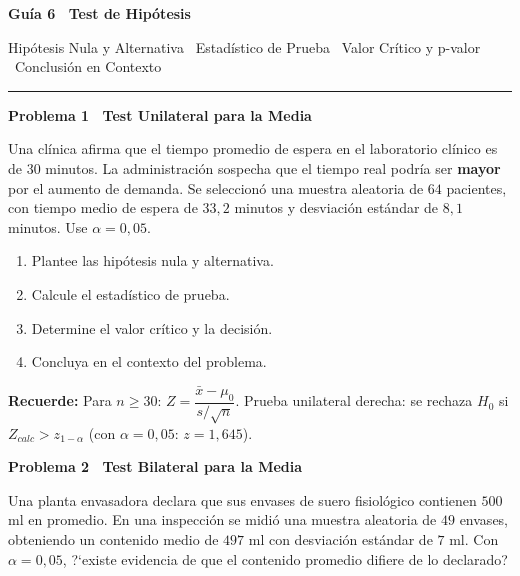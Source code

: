 \documentclass[10pt,letterpaper]{article}
\newcommand{\seccion}[1]{%
  \vspace{2pt}%
  \begin{tcolorbox}[enhanced,colback=white,colframe=black,arc=0pt,boxrule=0pt,
    leftrule=2pt,left=6pt,right=6pt,top=1pt,bottom=1pt]
    {\normalsize\bfseries\sffamily #1}
  \end{tcolorbox}%
  \vspace{1pt}%
}
\newcommand{\reglacaja}[1]{%
  \begin{tcolorbox}[enhanced,colback=white,colframe=black,arc=0pt,boxrule=0.5pt,
    left=6pt,right=6pt,top=2pt,bottom=2pt,breakable]
  \small\sffamily #1
  \end{tcolorbox}%
}
\begin{document}
\thispagestyle{empty}

\begin{center}
  {\fontsize{15}{17}\selectfont\bfseries\sffamily Gu\'ia 6 \textendash\ Test de Hip\'otesis\par}
  \vspace{0.05cm}
  {\small\sffamily Hip\'otesis Nula y Alternativa \textperiodcentered\ Estad\'istico de Prueba \textperiodcentered\ Valor Cr\'itico y p-valor \textperiodcentered\ Conclusi\'on en Contexto\par}
  {\rule{3cm}{0.6pt}}
\end{center}

\vspace{0.15cm}

\seccion{Problema 1 \textendash\ Test Unilateral para la Media}

\noindent\sffamily\small Una cl\'inica afirma que el tiempo promedio de espera en el laboratorio cl\'inico es de $30$ minutos. La administraci\'on sospecha que el tiempo real podr\'ia ser \textbf{mayor} por el aumento de demanda. Se seleccion\'o una muestra aleatoria de $64$ pacientes, con tiempo medio de espera de $33{,}2$ minutos y desviaci\'on est\'andar de $8{,}1$ minutos. Use $\alpha=0{,}05$.

\begin{enumerate}[leftmargin=1.2cm, label=\textbf{\alph*)}, itemsep=2pt, topsep=2pt]
  \item Plantee las hip\'otesis nula y alternativa.
  \item Calcule el estad\'istico de prueba.
  \item Determine el valor cr\'itico y la decisi\'on.
  \item Concluya en el contexto del problema.
\end{enumerate}

\reglacaja{%
\textbf{Recuerde:} Para $n\geq30$: $Z=\dfrac{\bar{x}-\mu_0}{s/\sqrt{n}}$. Prueba unilateral derecha: se rechaza $H_0$ si $Z_{calc}>z_{1-\alpha}$ (con $\alpha=0{,}05$: $z=1{,}645$).%
}

\seccion{Problema 2 \textendash\ Test Bilateral para la Media}

\noindent\sffamily\small Una planta envasadora declara que sus envases de suero fisiol\'ogico contienen $500$ ml en promedio. En una inspecci\'on se midi\'o una muestra aleatoria de $49$ envases, obteniendo un contenido medio de $497$ ml con desviaci\'on est\'andar de $7$ ml. Con $\alpha=0{,}05$, ?`existe evidencia de que el contenido promedio difiere de lo declarado?
\end{document}
